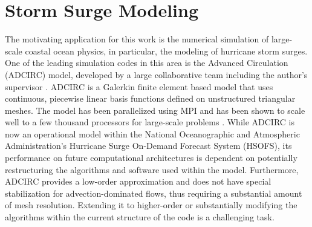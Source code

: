 \section{Storm Surge Modeling}
\label{sec:intro:surge}
The motivating application for this work is the numerical simulation of large-scale coastal ocean physics, in particular, the modeling of hurricane storm surges.  One of the leading simulation codes in this area is the Advanced Circulation (ADCIRC) model, developed by a large collaborative team including the author's supervisor \cite{ADCIRC2017,Westerink2008,Bunya2010,Dietrich2010,Dietrich2011a,Dietrich2011b,Hope2016,Hope2013}.  ADCIRC is a Galerkin finite element based model that uses continuous, piecewise linear basis functions defined on unstructured triangular meshes.  The model has been parallelized using MPI and has been shown to scale well to a few thousand processors for large-scale problems \cite{Tanaka2011}.   While ADCIRC is now an operational model within the National Oceanographic and Atmospheric Administration's Hurricane Surge On-Demand Forecast System (HSOFS),  its performance on future computational architectures is dependent on potentially restructuring the algorithms and software used within the model.  Furthermore, ADCIRC provides a low-order approximation and does not have special stabilization for advection-dominated flows, thus requiring a substantial amount of mesh resolution. Extending it to higher-order or substantially modifying the algorithms within the current structure of the code is a challenging task.

